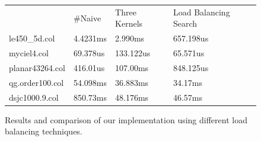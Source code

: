\documentclass[12pt] {article}
\begin{document}
\begin{figure}[tbh]
 \centering    
\begin{tabular}{ |p{4cm}||p{3cm}|| p{4cm}|p{4cm}|}
 \hline
   & $\#$Naive & Three Kernels &  Load Balancing Search \\ 
     
     \hhline{|=||=|=|=|}
 \hline
 le450\_5d.col & 4.4231ms  & 2.990ms  &657.198us \\
 \hline
 myciel4.col & 69.378us       & 133.122us  &65.571us \\
 \hline
   planar43264.col & 416.01us &  107.00ms & 848.125us\\
 \hline
   qg.order100.col & 54.098ms & 36.883ms   & 34.17ms\\
 \hline
   dsjc1000.9.col & 850.73ms & 48.176ms   &46.57ms \\
 \hline
 
 
\end{tabular} 
\caption{Results and comparison of our implementation using different load balancing techniques.}
   \label{tab:results2}
\end{figure} 
\end{document}
